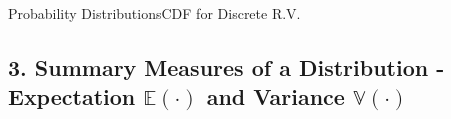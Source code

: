 \documentclass[8pt, usepdftitle = false]{beamer}
\begin{document}
\begin{frame}[allowframebreaks]{Probability Distributions}{CDF for Discrete R.V.}
\begin{itemize}













\end{itemize}

\end{frame}





\subsection{3. Summary Measures of a Distribution - Expectation $\mathbb{E}(\cdot)$ and Variance $\mathbb{V}(\cdot)$}

\frame{\subsectionpage}
\end{document}

